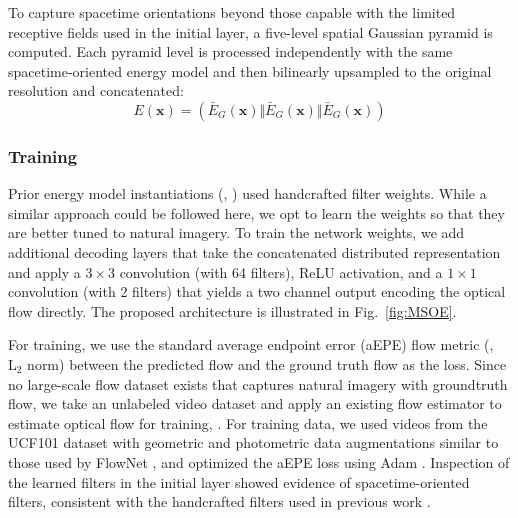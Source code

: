 To capture spacetime orientations beyond those capable
with the limited receptive fields used in the initial
layer, a five-level spatial Gaussian pyramid is computed.
Each pyramid level is processed independently
with the same spacetime-oriented energy model and then
bilinearly upsampled to the original resolution and
concatenated:
\begin{equation}
	E(\mathbf{x}) = \left( \bar{E}_G(\mathbf{x}) \Vert \bar{E}_G(\mathbf{x}) \Vert \bar{E}_G(\mathbf{x})\right)
\end{equation}

\subsubsection{Training}

Prior energy model instantiations (\eg,
\cite{adelson1985spatiotemporal,derpanis2012spacetime,simoncelli1998})
used handcrafted filter weights.
While a similar approach could be followed here, we
opt to learn the weights so that they are better
tuned to natural imagery.
To train the network weights, we add additional decoding
layers that take the concatenated distributed
representation and apply a $3\times 3$ convolution
(with 64 filters), ReLU activation, and a $1\times 1$
convolution (with 2 filters) that yields a two channel
output encoding the optical flow directly.
The proposed architecture is illustrated in
Fig.\ \ref{fig:MSOE}.



For training, we use the standard average
endpoint error (aEPE) flow metric (\ie, $\text{L}_2$
norm) between the predicted flow and the ground truth
flow as the loss.
Since no large-scale flow dataset exists that captures
natural imagery with groundtruth flow, we take an
unlabeled video dataset and apply an existing flow
estimator \cite{revaud2015epicflow} to estimate optical
flow for training,
\cf \cite{tran2016}.
For training data, we used videos from the UCF101
dataset \cite{soomro2012ucf101} with geometric
and photometric data augmentations similar to those used
by FlowNet \cite{dosovitskiy2015}, and optimized the aEPE loss using
Adam \cite{kingma2017}.
Inspection of the learned filters in the initial layer
showed evidence of spacetime-oriented filters, consistent with
the handcrafted filters used in previous work \cite{derpanis2012spacetime}.

